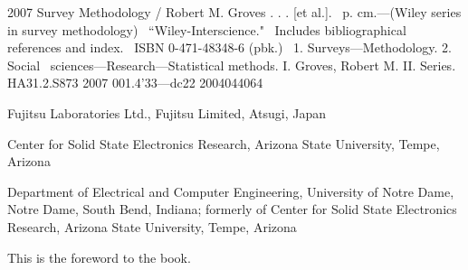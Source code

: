 \documentclass{wileySix}
\begin{document}
\subtitle{This is the Subtitle}




\halftitlepage

\titlepage


\begin{copyrightpage}{2007}
Survey Methodology / Robert M. Groves . . . [et al.].
\       p. cm.---(Wiley series in survey methodology)
\    ``Wiley-Interscience."
\    Includes bibliographical references and index.
\    ISBN 0-471-48348-6 (pbk.)
\    1. Surveys---Methodology.  2. Social 
\  sciences---Research---Statistical methods.  I. Groves, Robert M.  II. %
Series.\\

HA31.2.S873 2007
001.4'33---dc22                                             2004044064
\end{copyrightpage}



\dedication{To my parents}

\begin{contributors}
 Fujitsu Laboratories Ltd., Fujitsu Limited, Atsugi,
Japan

 Center for Solid State Electronics Research, Arizona
State University, Tempe, Arizona

 Department of Electrical and
Computer Engineering, University of Notre Dame, Notre Dame, South Bend, 
Indiana; formerly of
Center for Solid State Electronics Research, Arizona
State University, Tempe, Arizona 
\end{contributors}

\contentsinbrief
\tableofcontents
\listoffigures
\listoftables


\begin{foreword}
This is the foreword to the book.
\end{foreword}
\end{document}

